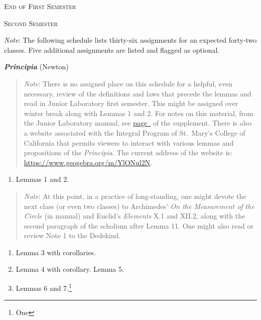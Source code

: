 \documentclass[10pt]{article}
\begin{document}
{\bigskip

\begin{center}
\textsc{\small{End of First Semester}}
\end{center}


\newpage
\begin{center}
	\textsc{\small{Second Semester}}
\end{center}
{\small \emph{Note}: The following schedule lists 
	thirty-six assignments for an expected forty-two
	classes. Five additional
	assignments are listed and flagged as optional.}

\textbf{\emph{Principia}} (Newton)
\label{NewtonStart}
\vspace{-0.5em}
\begin{quote}
{\small\emph{Note}: There is no assigned place on this
	schedule for a helpful, even necessary, review of
	the definitions and laws that precede the lemmas and
	read in Junior Laboratory first semester. This might
	be assigned over winter break along with Lemmas 1
	and 2. For notes on this material, from the Junior
	Laboratory manual, see
	\hyperref[supple.64]{page~\pageref{supple.64}} of
	the supplement. There is also a website associated
	with the Integral Program of St.\ Mary's College of
	California that permits viewers to interact with
	various lemmas and propositions of the \emph{Principia}.
	The current address of the website is: \href{https://www.geogebra.org/m/YlONul2N}{https://www.geogebra.org/m/YlONul2N}.}
\end{quote}
\begin{enumerate}[noitemsep] \item
		Lemmas 1 and 2.  \end{enumerate}
		\vspace{-0.5em}
\begin{quote} \small{\emph{Note}: At this point, in a
		practice of long-standing, one might devote
		the next class (or even two classes) to
		Archimedes' \emph{On the Measurement of the
			Circle} (in manual) and Euclid's
		\emph{Elements} X.1 and XII.2, along with
		the second paragraph of the scholium after
		Lemma 11. One might also read or review Note
		1 to the Dedekind.  \label{Dedekind}}
\end{quote}
\begin{enumerate}[resume*] \item Lemma 3 with
		corollaries.  \item Lemma 4 with corollary.
		Lemma 5.  \item Lemmas 6 and 7.\footnote{One
}
\end{enumerate}}
\end{document}
